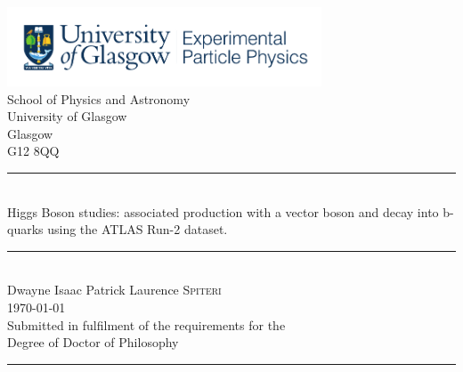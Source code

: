 \documentclass[12pt,titlepage,oneside]{book}
\newcommand{\VHbb}{\ensuremath{VH, H\to b\bar{b}} }                      %
\begin{document}

	\begin{center} %
	\includegraphics[width=0.7\textwidth]{ExperPartPhys_colour.pdf}~\\[4mm]%
	School of Physics and Astronomy\\
	University of Glasgow\\
	Glasgow\\
	G12 8QQ\\[4mm] %

	\rule[0.4cm]{15cm}{.2pt}\\ %

	{\Huge Higgs Boson studies:}
	{\Huge associated production with a vector boson and decay into b-quarks using the ATLAS Run-2 dataset.}\\[1cm] %
	\rule[0.4cm]{15cm}{.2pt}\\[4cm] %
	{\LARGE Dwayne Isaac Patrick Laurence \textsc{Spiteri}}\\[1cm] %
	{\small \today}\\[1cm] %
	{\small 
		Submitted in fulfilment of the requirements for the\\
		Degree of Doctor of Philosophy}\\[1cm] %
	\rule[0.4cm]{15cm}{.2pt} 
	\end{center}


\frontmatter  %



\doublespacing
\end{document}
